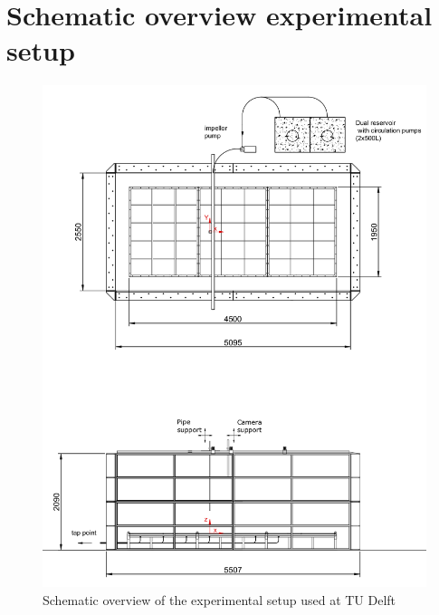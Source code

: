 \chapter{Schematic overview experimental setup}
\label{app:experimental_setup}

\begin{figure}[ht!]
    \centering
    \includegraphics[width=1\textwidth]{Images/Total_overview_Tank.png}
    \caption{Schematic overview of the experimental setup used at TU Delft}
    \label{fig:Total_overview_Tank}
\end{figure}